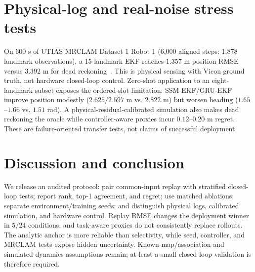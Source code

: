 \documentclass{article}
\begin{document}
\section{Physical-log and real-noise stress tests}
On 600 s of UTIAS MRCLAM Dataset 1 Robot 1 (6,000 aligned steps; 1,878 landmark observations), a 15-landmark EKF reaches $1.357$ m position RMSE versus $3.392$ m for dead reckoning~\citep{leung2011utias}. This is physical sensing with Vicon ground truth, not hardware closed-loop control. Zero-shot application to an eight-landmark subset exposes the ordered-slot limitation: SSM-EKF/GRU-EKF improve position modestly ($2.625/2.597$ m vs. $2.822$ m) but worsen heading ($1.65$--$1.66$ vs. $1.51$ rad). A physical-residual-calibrated simulation also makes dead reckoning the oracle while controller-aware proxies incur $0.12$--$0.20$ m regret. These are failure-oriented transfer tests, not claims of successful deployment.

\section{Discussion and conclusion}
We release an audited protocol: pair common-input replay with stratified closed-loop tests; report rank, top-1 agreement, and regret; use matched ablations; separate environment/training seeds; and distinguish physical logs, calibrated simulation, and hardware control. Replay RMSE changes the deployment winner in $5/24$ conditions, and task-aware proxies do not consistently replace rollouts. The analytic anchor is more reliable than selectivity, while seed, controller, and MRCLAM tests expose hidden uncertainty. Known-map/association and simulated-dynamics assumptions remain; at least a small closed-loop validation is therefore required.
\end{document}
